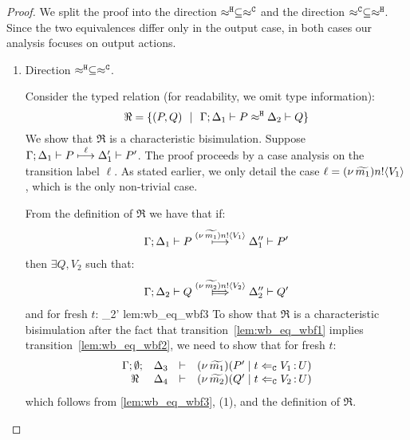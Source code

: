 \begin{proof}
	\noi
	We split the proof into the direction
	$\approx^\mathtt{H} \subseteq \approx^\mathtt{C}$ and the direction
	$\approx^\mathtt{C} \subseteq \approx^\mathtt{H}$.
 Since the two equivalences differ only in the output case, in both cases our analysis focuses on output actions.

	\begin{enumerate}
		\item	Direction $\approx^\mathtt{H} \subseteq \approx^\mathtt{C}$.

				\noi Consider the typed relation (for readability, we omit type information):
				\[
					\Re = \{
								(P, Q) 
								\ \ |\ \ 
								\Gamma; \Delta_1 \vdash P \approx^\mathtt{H} \Delta_2 \vdash Q\}
				\]
				We show that $\Re$ is a characteristic bisimulation.
				Suppose
				$
						\Gamma; \Delta_1 \vdash P \stackrel{ \ell}{\longmapsto} \Delta_1' \vdash P'
				$.
				The proof proceeds by a case analysis on the transition label $\ell$.
				As stated earlier, we only detail the case 
				$\ell = (\nu\, \widetilde{m_1}) n ! \langle V_1 \rangle$, which is the only non-trivial case.

							\smallskip
							
							 From the definition of $\Re$ we have that if:
							\begin{eqnarray}
								\Gamma; \Delta_1 \vdash P \stackrel{(\nu\, \widetilde{m_1}) n ! \langle V_1 \rangle}{\longmapsto} \Delta_1'' \vdash P'
								\label{lem:wb_eq_wbf1}
							\end{eqnarray}
							then $\exists Q, V_2$ such that:
							\begin{eqnarray}
								\horel{\Gamma}{\Delta_2}{Q}{\Hby{\news{\widetilde{m_2}} \bactout{n}{V_2}}}{\Delta_2''}{Q'}
								\label{lem:wb_eq_wbf2}
							\end{eqnarray}
							and for fresh $t$:
								{\hwb}
								{\Delta_2'}{}
								{lem:wb_eq_wbf3}
							\noi 
							To show that $\Re$ is a characteristic bisimulation
							after the fact that transition~\eqref{lem:wb_eq_wbf1} implies transition~\eqref{lem:wb_eq_wbf2},
							we need to show that for fresh $t$:
							\begin{eqnarray}
								\begin{array}{rcll} \Gamma; \emptyset; &\Delta_3& \vdash& (\nu\, \widetilde{m_1})(P' \;|\; t \Leftarrow_{\mathtt{C}} V_1{\,:\,}U)\\ \ \Re\  &\Delta_4& \vdash &  (\nu\, \widetilde{m_2})(Q' \;|\; t \Leftarrow_{\mathtt{C}} V_2{\,:\,}U) \end{array}
								\label{lem:wb_eq_wbf4}
							\end{eqnarray}
							\noi which follows from \eqref{lem:wb_eq_wbf3}, (1),
							and the definition of $\Re$.


\end{enumerate}
\end{proof}
